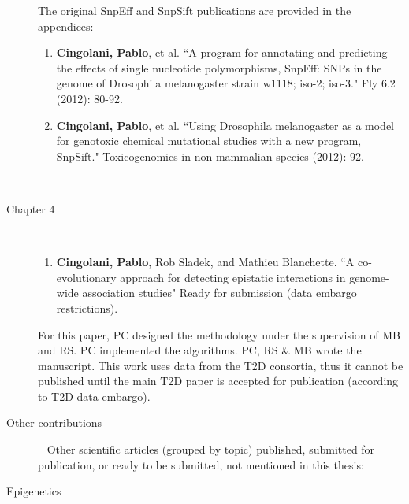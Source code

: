 \begin{description}
\begin{enumerate}[resume]
		\end{enumerate}
	
		The original SnpEff and SnpSift publications are provided in the appendices:
	
		\begin{enumerate}[resume]
		
			\item \textbf{Cingolani, Pablo}, et al. ``A program for annotating and predicting the effects of single nucleotide polymorphisms, SnpEff: SNPs in the genome of Drosophila melanogaster strain w1118; iso-2; iso-3." Fly 6.2 (2012): 80-92.
			
			\item \textbf{Cingolani, Pablo}, et al. ``Using Drosophila melanogaster as a model for genotoxic chemical mutational studies with a new program, SnpSift." Toxicogenomics in non-mammalian species (2012): 92.
		
		\end{enumerate}
		~ \\
	
	\item[Chapter 4] ~
	
		\begin{enumerate}[resume]
		\item \textbf{Cingolani, Pablo}, Rob Sladek, and Mathieu Blanchette. ``A co-evolutionary approach for detecting epistatic interactions in genome-wide association studies" Ready for submission (data embargo restrictions).
		\end{enumerate}
	
		For this paper, PC designed the methodology under the supervision of MB and RS. PC implemented the algorithms. PC, RS \& MB wrote the manuscript. This work uses data from the T2D consortia, thus it cannot be published until the main T2D paper is accepted for publication (according to T2D data embargo).
		\\
	
	\item[Other contributions] ~	\linebreak
		Other scientific articles (grouped by topic) published, submitted for publication, or ready to be submitted, not mentioned in this thesis:
		\\

	\item[Epigenetics] ~


\end{description}

